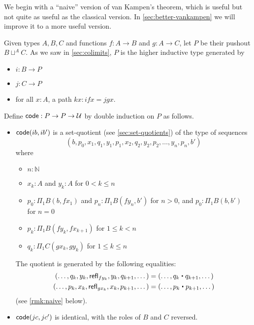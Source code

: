 We begin with a ``naive'' version of van Kampen's theorem, which is useful but not quite as useful as the classical version.
In \autoref{sec:better-vankampen} we will improve it to a more useful version.

Given types $A,B,C$ and functions $f:A\to B$ and $g:A\to C$, let $P$ be their pushout $B\sqcup^A C$.
As we saw in \autoref{sec:colimits}, $P$ is the higher inductive type generated by
\begin{itemize}
\item $i:B\to P$
\item $j:C\to P$
\item for all $x:A$, a path $k x:ifx = jgx$.
\end{itemize}
Define $\mathsf{code}:P\to P\to \mathcal{U}$ by double induction on $P$ as follows.
\begin{itemize}
\item $\mathsf{code}(ib,ib')$ is a set-quotient (see \autoref{sec:set-quotients}) of the type of sequences %
  \[ (b, p_0, x_1, q_1, y_1, p_1, x_2, q_2, y_2, p_2, \dots, y_n, p_n, b') \]
  where
  \begin{itemize}
  \item $n:\mathbb{N}$
  \item $x_k:A$ and $y_k:A$ for $0<k \le n$
  \item $p_0:\Pi_1B(b,f x_1)$ and $p_n:\Pi_1B(f y_n, b')$ for $n>0$, and $p_0:\Pi_1B(b,b')$ for $n=0$
  \item $p_k:\Pi_1B(f y_k, fx_{k+1})$ for $1\le k < n$
  \item $q_k:\Pi_1C(gx_k, gy_k)$ for $1\le k\le n$
  \end{itemize}
  The quotient is generated by the following equalities:
  \begin{alignat*}{2}
    (\dots, q_k, y_k, \refl{fy_k}, y_k, q_{k+1},\dots)
    &= (\dots, q_k\ct q_{k+1},\dots)\\
    (\dots, p_k, x_k, \refl{gx_k}, x_k, p_{k+1},\dots)
    &= (\dots, p_k\ct p_{k+1},\dots)
  \end{alignat*}
  (see \autoref{rmk:naive} below).
\item $\mathsf{code}(jc,jc')$ is identical, with the roles of $B$ and $C$ reversed.

\end{itemize}
